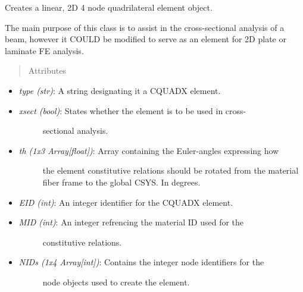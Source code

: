 \documentclass[letterpaper,10pt,english]{sphinxmanual}
\begin{document}
\begin{fulllineitems}
\label{structures:AeroComBAT.Structures.CQUADX}
Creates a linear, 2D 4 node quadrilateral element object.

The main purpose of this class is to assist in the cross-sectional
analysis of a beam, however it COULD be modified to serve as an element for
2D plate or laminate FE analysis.
\begin{quote}\begin{description}
\item[{Attributes}] \leavevmode
\end{description}\end{quote}
\begin{itemize}
\item {} 
\emph{type (str)}: A string designating it a CQUADX element.

\item {} \begin{description}
\item[{\emph{xsect (bool)}: States whether the element is to be used in cross-}] \leavevmode
sectional analysis.

\end{description}

\item {} \begin{description}
\item[{\emph{th (1x3 Array{[}float{]})}: Array containing the Euler-angles expressing how}] \leavevmode
the element constitutive relations should be rotated from the
material fiber frame to the global CSYS. In degrees.

\end{description}

\item {} 
\emph{EID (int)}: An integer identifier for the CQUADX element.

\item {} \begin{description}
\item[{\emph{MID (int)}: An integer refrencing the material ID used for the}] \leavevmode
constitutive relations.

\end{description}

\item {} \begin{description}
\item[{\emph{NIDs (1x4 Array{[}int{]})}: Contains the integer node identifiers for the}] \leavevmode
node objects used to create the element.


\end{description}
\end{itemize}
\end{fulllineitems}
\end{document}
